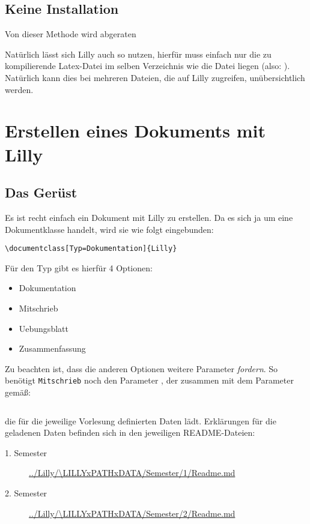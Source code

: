 \subsection{Keine Installation}
\begin{bemerkung}
    Von dieser Methode wird abgeraten
\end{bemerkung}
Natürlich lässt sich Lilly auch so nutzen, hierfür muss einfach nur die zu kompilierende Latex-Datei im selben Verzeichnis wie die Datei  liegen (also: ). Natürlich kann dies bei mehreren Dateien, die auf Lilly zugreifen, unübersichtlich werden.
\clearpage
\section[Erstellen eines Dokuments mit Lilly]{Erstellen eines Dokuments mit Lilly \tiny{}}
\subsection{Das Gerüst}
Es ist recht einfach ein Dokument mit Lilly zu erstellen. Da es sich ja um eine Dokumentklasse handelt, wird sie wie folgt eingebunden:
\begin{lstlisting}[language=lLatex]
\documentclass[Typ=Dokumentation]{Lilly}
\end{lstlisting}
Für den Typ gibt es hierfür 4 Optionen:
\begin{multicols}{2}
    \begin{itemize}[label=$\diamond$]\narrowitems
        \item Dokumentation
        \item Mitschrieb
        \item Uebungsblatt
        \item Zusammenfassung
    \end{itemize}
\end{multicols}
Zu beachten ist, dass die anderen Optionen weitere Parameter \emph{fordern}. \newline
So benötigt \verb|Mitschrieb| noch den Parameter , der zusammen mit dem Parameter  gemäß:
\begin{lstlisting}[language=lLatex,frame=none]

\end{lstlisting}
die für die jeweilige Vorlesung definierten Daten lädt.
Erklärungen für die geladenen Daten befinden sich in den jeweiligen README-Dateien:
\begin{description}
    \item[1. Semester] \url{../Lilly/\LILLYxPATHxDATA/Semester/1/Readme.md}
    \item[2. Semester] \url{../Lilly/\LILLYxPATHxDATA/Semester/2/Readme.md}
\end{description}


